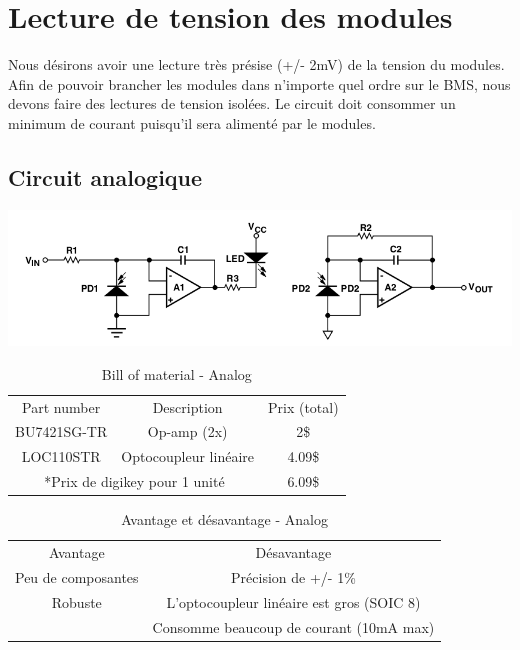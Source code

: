 

\section{Lecture de tension des modules}
				Nous désirons avoir une lecture très présise (+/- 2mV) de la tension du modules. Afin de pouvoir brancher les modules dans n'importe quel ordre sur le BMS, nous devons faire des lectures de tension isolées. Le circuit doit consommer un minimum de courant puisqu'il sera alimenté par le modules.
			\subsection{Circuit analogique}
				
				\begin{center}
					\includegraphics[scale=0.5]{Lecture/images/Analog} \\ \vspace{0cm}
				\end{center}
			
					\begin{table}[h!]	
						\centering
						\begin{tabular}{|c|c|c|}
							\hline
							Part number & Description & Prix (total)\\ \hhline{|=|=|=|}
							BU7421SG-TR & Op-amp (2x) & 2\$ \\ \hline
							LOC110STR & Optocoupleur linéaire & 4.09\$ \\ \hline
							 \multicolumn{2}{|c|}{*Prix de digikey pour 1 unité }& 6.09\$ \\ \hline
						\end{tabular}
						\caption{Bill of material - Analog}
					\end{table}
						
					\begin{table}[h!]
					\centering
						\begin{tabular}{|c|c|}
							\hline
							Avantage & Désavantage\\ \hhline{|=|=|}
							Peu de composantes & Précision de +/- 1\% \\ \hline
							Robuste & L'optocoupleur linéaire est gros (SOIC 8)\\ \hline
							 & Consomme beaucoup de courant (10mA max)\\ \hline
						\end{tabular}
						\caption{Avantage et désavantage - Analog}
					\end{table} 
					
